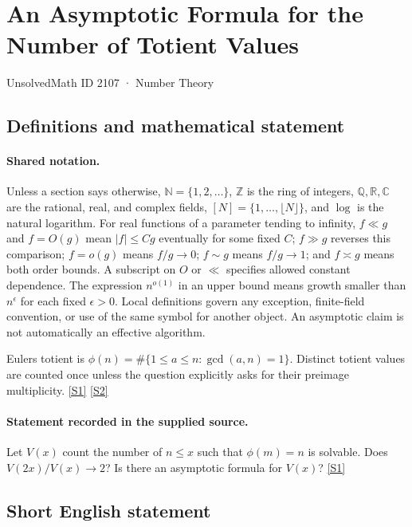 \documentclass[11pt,a4paper]{article}
\newcommand{\N}{\mathbb{N}}
\newcommand{\Z}{\mathbb{Z}}
\newcommand{\Q}{\mathbb{Q}}
\newcommand{\R}{\mathbb{R}}
\newcommand{\C}{\mathbb{C}}
\newcommand{\sref}[2]{\hyperlink{source:#1:#2}{[S#2]}}
\begin{document}

\setcounter{section}{2106}

\section{An Asymptotic Formula for the Number of Totient Values}\label{2107}

{\small\sffamily UnsolvedMath ID 2107 · Number Theory}

\subsection{Definitions and mathematical statement}

\paragraph{Shared notation.}Unless a section says otherwise, $\N=\{1,2,\ldots\}$,
$\Z$ is the ring of integers, $\Q,\R,\C$ are the rational, real, and complex
fields, $[N]=\{1,\ldots,\lfloor N\rfloor\}$, and $\log$ is the natural
logarithm. For real functions of a parameter tending to infinity,
$f\ll g$ and $f=O(g)$ mean $|f|\leq Cg$ eventually for some fixed $C$;
$f\gg g$ reverses this comparison; $f=o(g)$ means $f/g\to0$;
$f\sim g$ means $f/g\to1$; and $f\asymp g$ means both order bounds.
A subscript on $O$ or $\ll$ specifies allowed constant dependence.
The expression $n^{o(1)}$ in an upper bound means growth smaller than
$n^\epsilon$ for each fixed $\epsilon>0$. Local definitions govern any
exception, finite-field convention, or use of the same symbol for another
object. An asymptotic claim is not automatically an effective algorithm.



Euler\textquotesingle s totient is $\phi(n)=\#\{1\leq a\leq n:\gcd(a,n)=1\}$. Distinct totient values are counted once unless the question explicitly asks for their preimage multiplicity. \sref{2107}{1} \sref{2107}{2}

\paragraph{Statement recorded in the supplied source.}
Let $V(x)$ count the number of $n\leq x$ such that $\phi(m)=n$ is solvable. Does $V(2x)/V(x)\to 2$? Is there an asymptotic formula for $V(x)$? \sref{2107}{1}

\subsection{Short English statement}
\end{document}
